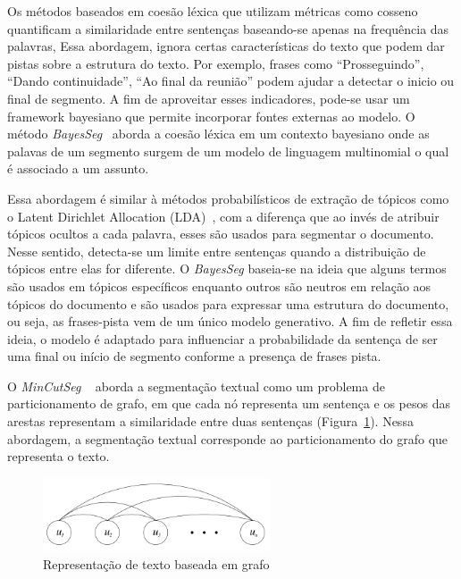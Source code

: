  




Os métodos baseados em coesão léxica que utilizam métricas como cosseno quantificam a similaridade entre sentenças baseando-se apenas na frequência das palavras, Essa abordagem, ignora certas características do texto que podem dar pistas sobre a estrutura do texto. Por exemplo, frases como ``Prosseguindo'', ``Dando continuidade'', ``Ao final da reunião'' podem ajudar a detectar o inicio ou final de segmento. A fim de aproveitar esses indicadores, pode-se usar um framework bayesiano que permite incorporar fontes externas ao modelo. O método \textit{BayesSeg}~\cite{Eisenstein2008} aborda a coesão léxica em um contexto bayesiano onde as palavas de um segmento surgem de um modelo de linguagem multinomial o qual é associado a um assunto. 

Essa abordagem é similar à métodos probabilísticos de extração de tópicos como o Latent Dirichlet Allocation (LDA)~\cite{Blei2003}, com a diferença que ao invés de atribuir tópicos ocultos a cada palavra, esses são usados para segmentar o documento. Nesse sentido, detecta-se um limite entre sentenças quando a distribuição de tópicos entre elas for diferente. O \textit{BayesSeg} baseia-se na ideia que alguns termos são usados em tópicos específicos enquanto outros são neutros em relação aos tópicos do documento e são usados para expressar uma estrutura do documento, ou seja, as frases-pista vem de um único modelo generativo. A fim de refletir essa ideia, o modelo é adaptado para influenciar a probabilidade da sentença de ser uma final ou início de segmento conforme a presença de frases pista.








O \textit{MinCutSeg} ~\cite{Malioutov:2006a} aborda a segmentação textual como um problema de particionamento de grafo, em que cada nó representa um sentença e os pesos das arestas representam a similaridade entre duas sentenças (Figura~\ref{fig:representacao-texto-grafo}). Nessa abordagem, a segmentação textual corresponde ao particionamento do grafo que representa o texto.


  \begin{figure}[!h]
	  \centering
	  \includegraphics[width=0.6\textwidth]{conteudo/capitulos/figs/graph-representation-of-text.png}
	  \caption{Representação de texto baseada em grafo~\cite{Malioutov:2006a}}
	  \label{fig:representacao-texto-grafo}
  \end{figure}


